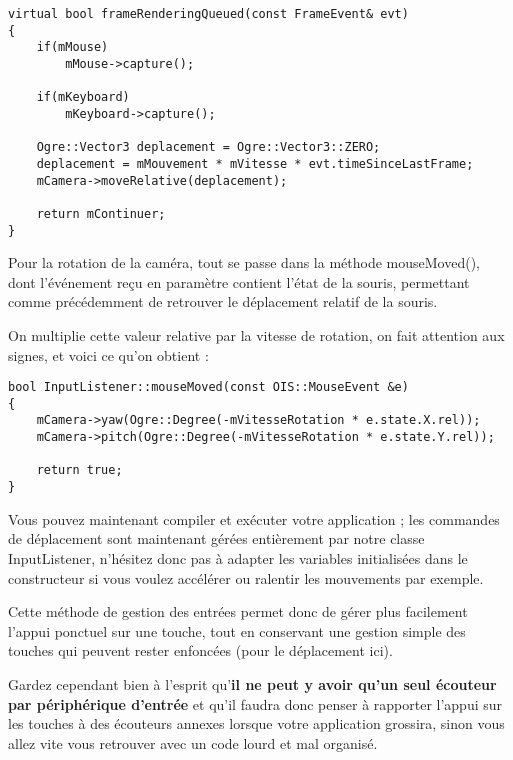 \begin{lstlisting}[caption={Impl\'ementation du d\'eplacement de la cam\'era dans la m\'ethode frameRenderingQueued}]
virtual bool frameRenderingQueued(const FrameEvent& evt)
{
    if(mMouse)
        mMouse->capture();

    if(mKeyboard)
        mKeyboard->capture();

    Ogre::Vector3 deplacement = Ogre::Vector3::ZERO;
    deplacement = mMouvement * mVitesse * evt.timeSinceLastFrame;
    mCamera->moveRelative(deplacement);

    return mContinuer;
}
\end{lstlisting}

Pour la rotation de la cam\'era, tout se passe dans la m\'ethode mouseMoved(), dont l'\'ev\'enement re\c{c}u en param\`etre contient l'\'etat de la souris, permettant comme pr\'ec\'edemment de retrouver le d\'eplacement relatif de la souris.

On multiplie cette valeur relative par la vitesse de rotation, on fait attention aux signes, et voici ce qu'on obtient :

\begin{lstlisting}[caption={Impl\'ementation de la rotation de la cam\'era dans la m\'ethode mouseMoved}]
bool InputListener::mouseMoved(const OIS::MouseEvent &e)
{
    mCamera->yaw(Ogre::Degree(-mVitesseRotation * e.state.X.rel));
    mCamera->pitch(Ogre::Degree(-mVitesseRotation * e.state.Y.rel));

    return true;
}
\end{lstlisting}

Vous pouvez maintenant compiler et ex\'ecuter votre application ; les commandes de d\'eplacement sont maintenant g\'er\'ees enti\`erement par notre classe InputListener, n'h\'esitez donc pas \`a adapter les variables initialis\'ees dans le constructeur si vous voulez acc\'el\'erer ou ralentir les mouvements par exemple.\newline

Cette m\'ethode de gestion des entr\'ees permet donc de g\'erer plus facilement l'appui ponctuel sur une touche, tout en conservant une gestion simple des touches qui peuvent rester enfonc\'ees (pour le d\'eplacement ici).

Gardez cependant bien \`a l'esprit qu'\textbf{il ne peut y avoir qu'un seul \'ecouteur par p\'eriph\'erique d'entr\'ee} et qu'il faudra donc penser \`a rapporter l'appui sur les touches \`a des \'ecouteurs annexes lorsque votre application grossira, sinon vous allez vite vous retrouver avec un code lourd et mal organis\'e.\newline

